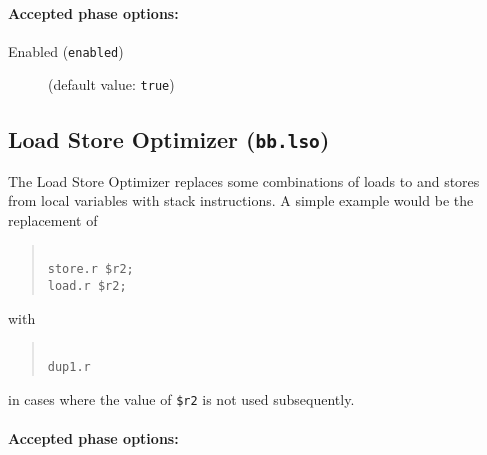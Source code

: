 \documentclass{article}
\begin{document}
\paragraph{Accepted phase options:} 

\begin{description}

\item[Enabled ({\tt enabled})]
(default value: {\tt true})






\end{description}

\subsection{Load Store Optimizer ({\tt bb.lso})}

The Load Store Optimizer replaces some combinations of loads to and stores from local variables with stack instructions. A simple example would be the replacement of

\begin{quote}\begin{verbatim}

store.r $r2;
load.r $r2;

\end{verbatim}\end{quote}

with 

\begin{quote}\begin{verbatim}

dup1.r

\end{verbatim}\end{quote}

in cases where the value of {\tt \$r2} is not used subsequently.


\paragraph{Accepted phase options:} 
\end{document}
